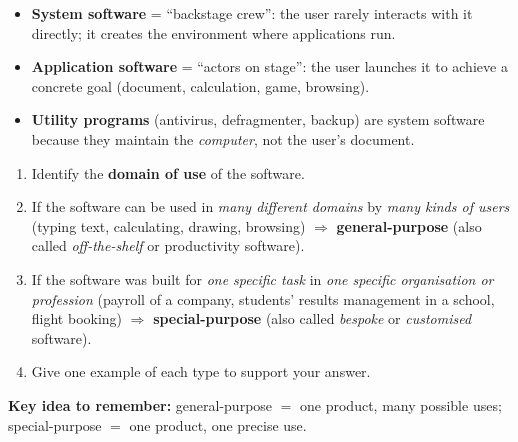 \documentclass[11pt]{article}
\begin{document}
\begin{aretenir}
\begin{itemize}
\item \textbf{System software} = ``backstage crew'': the user rarely interacts with it directly; it creates the environment where applications run.
\item \textbf{Application software} = ``actors on stage'': the user launches it to achieve a concrete goal (document, calculation, game, browsing).
\item \textbf{Utility programs} (antivirus, defragmenter, backup) are system software because they maintain the \emph{computer}, not the user's document.
\end{itemize}
\end{aretenir}

\begin{methode}
\begin{enumerate}
\item Identify the \textbf{domain of use} of the software.
\item If the software can be used in \emph{many different domains} by \emph{many kinds of users} (typing text, calculating, drawing, browsing) $\Rightarrow$ \textbf{general-purpose} (also called \emph{off-the-shelf} or productivity software).
\item If the software was built for \emph{one specific task} in \emph{one specific organisation or profession} (payroll of a company, students' results management in a school, flight booking) $\Rightarrow$ \textbf{special-purpose} (also called \emph{bespoke} or \emph{customised} software).
\item Give one example of each type to support your answer.
\end{enumerate}
\textbf{Key idea to remember:} general-purpose $=$ one product, many possible uses; special-purpose $=$ one product, one precise use.
\end{methode}
\end{document}

